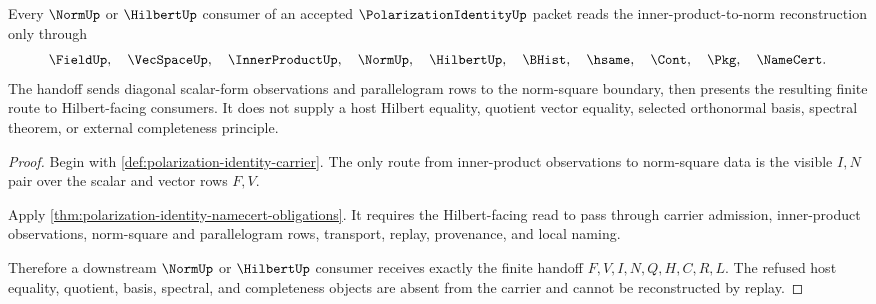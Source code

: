 \begin{theorem}
\label{thm:polarization-identity-innerproduct-norm-handoff}
Every $\NormUp$ or $\HilbertUp$ consumer of an accepted $\PolarizationIdentityUp$ packet reads the inner-product-to-norm reconstruction only through
$$
\FieldUp,\quad \VecSpaceUp,\quad \InnerProductUp,\quad \NormUp,\quad \HilbertUp,\quad \BHist,\quad \hsame,\quad \Cont,\quad \Pkg,\quad \NameCert .
$$
The handoff sends diagonal scalar-form observations and parallelogram rows to the norm-square boundary, then presents the resulting finite route to Hilbert-facing consumers. It does not supply a host Hilbert equality, quotient vector equality, selected orthonormal basis, spectral theorem, or external completeness principle.
\end{theorem}
\begin{proof}
Begin with \autoref{def:polarization-identity-carrier}. The only route from inner-product observations to norm-square data is the visible $I,N$ pair over the scalar and vector rows $F,V$.

Apply \autoref{thm:polarization-identity-namecert-obligations}. It requires the Hilbert-facing read to pass through carrier admission, inner-product observations, norm-square and parallelogram rows, transport, replay, provenance, and local naming.

Therefore a downstream $\NormUp$ or $\HilbertUp$ consumer receives exactly the finite handoff $F,V,I,N,Q,H,C,R,L$. The refused host equality, quotient, basis, spectral, and completeness objects are absent from the carrier and cannot be reconstructed by replay.
\end{proof}

\begin{closurestatus}{\PolarizationIdentityUp}
  \theoryclosure{\seedClosure}
  \formalstatus{\theoremCheckedV}
\end{closurestatus}

